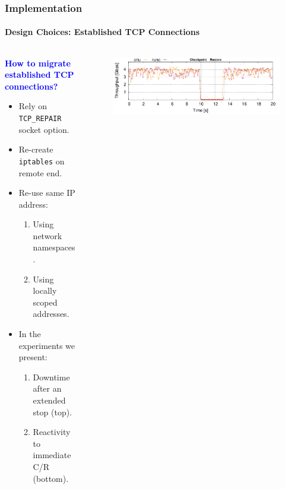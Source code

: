 \documentclass[9pt,    %
    english,            %
    xcolor=table,       %
    envcountsect,        %
    aspectratio=169     %
]{beamer}
\begin{document}
\begin{frame}
    \frametitle{Implementation}
    \framesubtitle{Design Choices: Established TCP Connections}

    \begin{columns}
        \begin{column}{.5\textwidth}

            \vspace{-40pt}

            \textbf{\textcolor{blue}{How to migrate established TCP connections?}}
            \begin{itemize}
                \item Rely on \texttt{TCP\_REPAIR} socket option.
                \item Re-create \texttt{iptables} on remote end.
                \item Re-use same IP address:
                \begin{enumerate}
                    \item Using network namespaces.\\[3pt]
                    \item Using locally scoped addresses.
                \end{enumerate}
                \item In the experiments we present:
                \begin{enumerate}
                    \item Downtime after an extended stop (top).\\[3pt]
                    \item Reactivity to immediate C/R (bottom).
                \end{enumerate}
            \end{itemize}
        \end{column}
        \begin{column}{.5\textwidth}
            \begin{figure}
                \centering
                \includegraphics[width=\textwidth]{./figs/tcp_established_downtime_microbenchmark.pdf}

\end{figure}
\end{column}
\end{columns}
\end{frame}
\end{document}
